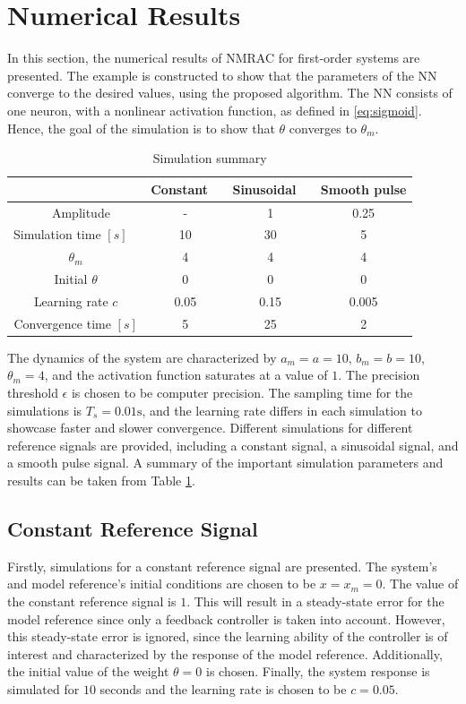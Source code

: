 \section{Numerical Results}
\label{sec:results}
In this section, the numerical results of NMRAC for first-order systems are presented. The example is constructed to show that the parameters of the NN converge to the desired values, using the proposed algorithm. The NN consists of one neuron, with a nonlinear activation function, as defined in \eqref{eq:sigmoid}. Hence, the goal of the simulation is to show that $\theta$ converges to $\theta_m$.

\begin{table}
    \centering
    \caption{Simulation summary}\label{tab:sim-settings}
    \begin{tabular}{ c c c c } 
         \hline
         & Constant  & Sinusoidal  & Smooth pulse \\
         \hline  
 Amplitude & - & 1 & 0.25 \\
 Simulation time $[s]$  & 10 & 30 & 5 \\
         $\theta_m$ & 4 & 4 & 4 \\
 Initial $\theta$ & 0 & 0 & 0 \\
 Learning rate $c$ & 0.05 & 0.15 & 0.005\\
 Convergence time $[s]$ & 5 & 25 & 2 \\
         \hline
    \end{tabular}
\end{table}

The dynamics of the system are characterized by $a_m=a=10$, $b_m=b=10$, $\theta_m=4$, and the activation function saturates at a value of $1$. The precision threshold $\epsilon$ is chosen to be computer precision. The sampling time for the simulations is $T_s=0.01\textrm{s}$, and the learning rate differs in each simulation to showcase faster and slower convergence. Different simulations for different reference signals are provided, including a constant signal, a sinusoidal signal, and a smooth pulse signal. A summary of the important simulation parameters and results can be taken from Table \ref{tab:sim-settings}.

\subsection{Constant Reference Signal}
Firstly, simulations for a constant reference signal are presented. The system's and model reference's initial conditions are chosen to be $x=x_m=0$. The value of the constant reference signal is $1$. This will result in a steady-state error for the model reference since only a feedback controller is taken into account. However, this steady-state error is ignored, since the learning ability of the controller is of interest and characterized by the response of the model reference. Additionally, the initial value of the weight $\theta=0$ is chosen. Finally, the system response is simulated for $10$ seconds and the learning rate is chosen to be $c=0.05$.

